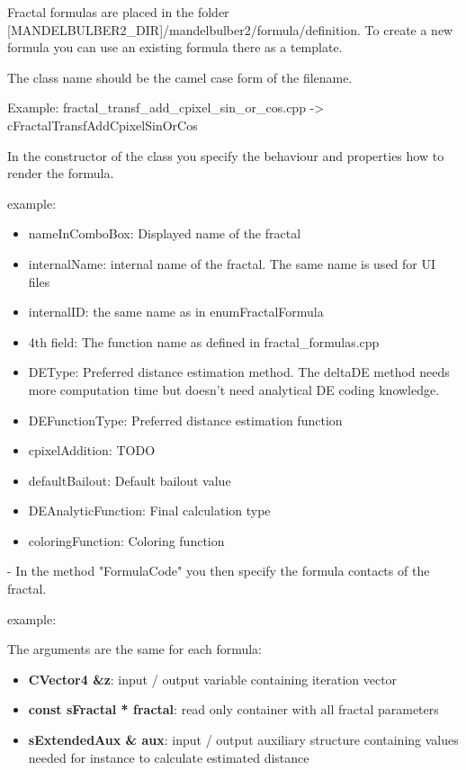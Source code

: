 Fractal formulas are placed in the folder [MANDELBULBER2\_DIR]/mandelbulber2/formula/definition.
To create a new formula you can use an existing formula there as a template.

The class name should be the camel case form of the filename.

Example:
fractal_transf_add_cpixel_sin_or_cos.cpp -> cFractalTransfAddCpixelSinOrCos

In the constructor of the class you specify the behaviour and properties how to render the formula.

example:


\begin{itemize}
	\item nameInComboBox: Displayed name of the fractal
	\item internalName: internal name of the fractal. The same name is used for UI files
	\item internalID: the same name as in enumFractalFormula
	\item 4th field: The function name as defined in fractal\_formulas.cpp
	\item DEType: Preferred distance estimation method. The deltaDE method needs more computation time but doesn't need analytical DE coding knowledge.
	\item DEFunctionType: Preferred distance estimation function
	\item cpixelAddition: TODO
	\item defaultBailout: Default bailout value
	\item DEAnalyticFunction: Final calculation type
	\item coloringFunction: Coloring function
\end{itemize}

- In the method "FormulaCode" you then specify the formula contacts of the fractal.

example:


The arguments are the same for each formula:
\begin{itemize}
	\item \textbf{CVector4 \&z}: input / output variable containing iteration vector
	\item \textbf{const sFractal * fractal}: read only container with all fractal parameters
	\item \textbf{sExtendedAux \& aux}: input / output auxiliary structure containing values 
		needed for instance to calculate estimated distance
\end{itemize}

